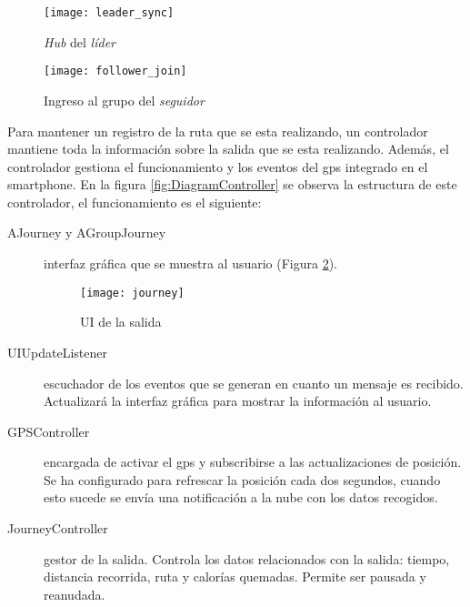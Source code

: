\begin{figure}[h]
	\begin{minipage}{.5\textwidth}
		\begin{center}
			\texttt{[image: leader\_sync]}
			\caption{\emph{Hub} del \emph{líder}}
			\label{fig:Hub}
		\end{center}
	\end{minipage}
\begin{minipage}{.5\textwidth}
	\begin{center}
		\texttt{[image: follower\_join]}
		\caption{Ingreso al grupo del \emph{seguidor}}
		\label{fig:FollowerJoin}
	\end{center}
\end{minipage}
\end{figure}

Para mantener un registro de la ruta que se esta realizando, un controlador
mantiene toda la información sobre la salida que se esta realizando. Además,
el controlador gestiona el funcionamiento y los eventos del \gls{gps} integrado
en el smartphone. En la figura \ref{fig:DiagramController} se observa la
estructura de este controlador, el funcionamiento es el siguiente:
\begin{description}
	\item[AJourney y AGroupJourney] interfaz gráfica que se muestra al usuario
	(Figura \ref{fig:Journey}).

	\begin{figure}[h]
		\begin{center}
			\texttt{[image: journey]}
			\caption{UI de la salida}
			\label{fig:Journey}
		\end{center}
	\end{figure}

	\item[UIUpdateListener] escuchador de los eventos que se generan en cuanto
	un mensaje es recibido. Actualizará la interfaz gráfica para mostrar la
	información al usuario.

	\item[GPSController] encargada de activar el \gls{gps} y subscribirse a las
	actualizaciones de posición. Se ha configurado para refrescar la posición
	cada dos segundos, cuando esto sucede se envía una notificación a la nube con
	los datos recogidos.

	\item[JourneyController] gestor de la salida. Controla los datos relacionados
	con la salida: tiempo, distancia recorrida, ruta y calorías quemadas. Permite
	ser pausada y reanudada.
\end{description}

